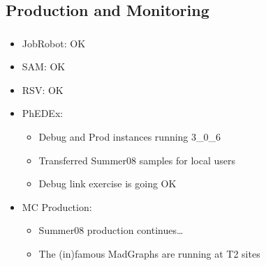 \documentclass{beamer}
\begin{document}
\subsection{Production and Monitoring}
\begin{frame}
\frametitle{}
\begin{itemize}
     \item JobRobot: OK
     \item SAM: OK
     \item RSV: OK
     \item PhEDEx:
     \begin{itemize}
        \item Debug and Prod instances running 3\_0\_6
        \item Transferred Summer08 samples for local users
        \item Debug link exercise is going OK
     \end{itemize}
     \item MC Production:
     \begin{itemize}
        \item Summer08 production continues\ldots{}
        \item The (in)famous MadGraphs are running at T2 sites
     \end{itemize}
\end{itemize}
\end{frame}
\end{document}
